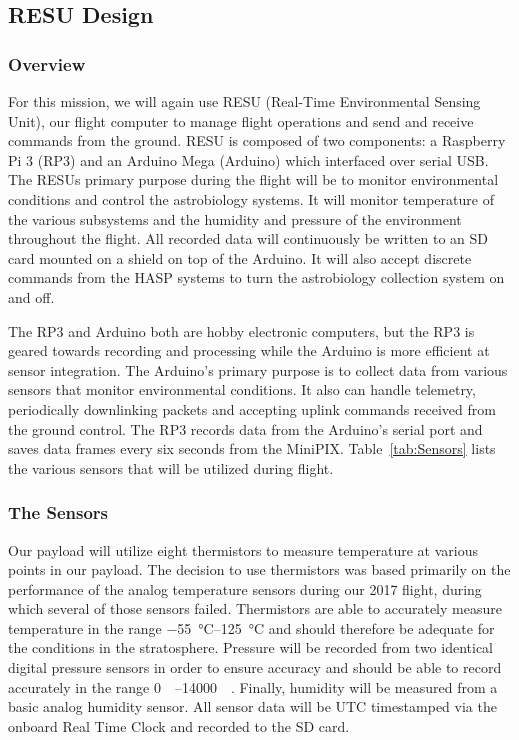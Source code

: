\subsection{RESU Design}
\label{sec:RESU-Design}

\subsubsection{Overview}

For this mission, we will again use RESU (Real-Time Environmental Sensing Unit), our flight computer to manage flight operations and send and receive commands from the ground. RESU is composed of two components: a Raspberry Pi 3 (RP3) and an Arduino Mega (Arduino) which interfaced over serial USB. The RESUs primary purpose during the flight will be to monitor environmental conditions and control the astrobiology systems. It will monitor temperature of the various subsystems and the humidity and pressure of the environment throughout the flight. All recorded data will continuously be written to an SD card mounted on a shield on top of the Arduino. It will also accept discrete commands from the HASP systems to turn the astrobiology collection system on and off.

   The RP3 and Arduino both are hobby electronic computers, but the RP3 is geared towards recording and processing while the Arduino is more efficient at sensor integration.  The Arduino's primary purpose is to collect data from various sensors that monitor environmental conditions. It also can handle telemetry, periodically downlinking packets and accepting uplink commands received from the ground control. The RP3 records data from the Arduino's serial port and saves data frames every six seconds from the MiniPIX.  Table~\ref{tab:Sensors} lists the various sensors that will be utilized during flight.

\subsubsection{The Sensors}

Our payload will utilize eight thermistors to measure temperature at various points in our payload. The decision to use thermistors was based primarily on the performance of the analog temperature sensors during our 2017 flight, during which several of those sensors failed. Thermistors are able to accurately measure temperature in the range \SIrange{-55}{125}{\celsius} and should therefore be adequate for the conditions in the stratosphere. Pressure will be recorded from two identical digital pressure sensors in order to ensure accuracy and should be able to record accurately in the range \SIrange{0}{14000}{\milli\bara}. Finally, humidity will be measured from a basic analog humidity sensor. All sensor data will be UTC timestamped via the onboard Real Time Clock and recorded to the SD card.

